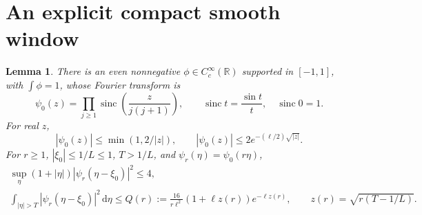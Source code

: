 \documentclass[11pt]{article}
\newtheorem{lemma}[theorem]{Lemma}
\theoremstyle{remark}\newtheorem{remark}[theorem]{Remark}
\newcommand{\R}{\mathbb R}
\newcommand{\dd}{\,\mathrm d}
\DeclareMathOperator{\sinc}{sinc}
\numberwithin{equation}{section}
\begin{document}
\section{An explicit compact smooth window}\label{sec:window}
\begin{lemma}\label{lem:window}
There is an even nonnegative $\phi\in C_c^\infty(\R)$ supported in $[-1,1]$, with $\int\phi=1$, whose Fourier transform is
\begin{equation}\label{eq:product}
 \psi_0(z)=\prod_{j\ge1}\sinc\!\left(\frac{z}{j(j+1)}\right),
 \qquad \sinc t=\frac{\sin t}{t},\quad \sinc0=1.
\end{equation}
For real $z$,
\begin{equation}\label{eq:windowdecay}
 |\psi_0(z)|\le\min(1,2/|z|),\qquad
 |\psi_0(z)|\le2e^{-(\ell/2)\sqrt{|z|}}.
\end{equation}
For $r\ge1$, $|\xi_0|\le1/L\le1$, $T>1/L$, and $\psi_r(\eta)=\psi_0(r\eta)$,
\begin{gather}
 \sup_\eta(1+|\eta|)|\psi_r(\eta-\xi_0)|^2\le4,\label{eq:windowweighted}\\
 \int_{|\eta|>T}|\psi_r(\eta-\xi_0)|^2\dd\eta
 \le Q(r):=\frac{16}{r\ell^2}(1+\ell z(r))e^{-\ell z(r)},
 \qquad z(r)=\sqrt{r(T-1/L)}.\label{eq:windowtail}
\end{gather}
\end{lemma}
\end{document}
